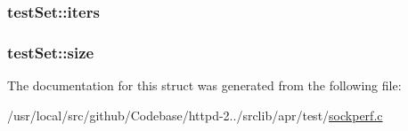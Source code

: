 \subsubsection[{\texorpdfstring{iters}{iters}}]{ test\+Set\+::iters}\hypertarget{structtestSet_a90ed3645019efebf0ec6ffc7bb69e9eb}{}\label{structtestSet_a90ed3645019efebf0ec6ffc7bb69e9eb}
\subsubsection[{\texorpdfstring{size}{size}}]{ test\+Set\+::size}\hypertarget{structtestSet_a3fd1a4c68f1cb020f0652534b07c25dd}{}\label{structtestSet_a3fd1a4c68f1cb020f0652534b07c25dd}


The documentation for this struct was generated from the following file\+:\begin{DoxyCompactItemize}
\item 
/usr/local/src/github/\+Codebase/httpd-\/2../srclib/apr/test/\hyperlink{sockperf_8c}{sockperf.\+c}\end{DoxyCompactItemize}
